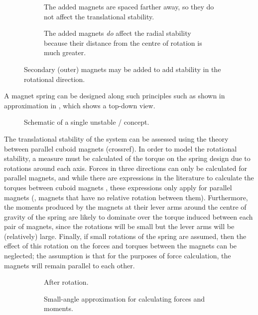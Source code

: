 \begin{figure}
  \begin{subfigure}
    \caption{
     The added magnets are spaced farther away,
     so they do not affect the
     translational stability.
     }
  \end{subfigure}
  \begin{subfigure}
    \caption{
      The added magnets \emph{do} affect the radial stability
      because their distance from the centre of rotation is much greater.
      }
  \end{subfigure}
  \caption{Secondary (outer) magnets may be added to add stability
      in the rotational direction.}
\end{figure}

A magnet spring can be designed along such principles such as shown in
approximation in , which shows a top-down view.

\begin{figure}
  \caption{Schematic of a single unstable \dof/ concept.}
\end{figure}

The translational stability of the system can be assessed using the theory between parallel cuboid magnets (crossref).
In order to model the rotational stability, a measure must be calculated of the torque on the spring design due to rotations around each axis.
Forces in three directions can only be calculated for parallel magnets, and while there are expressions in the literature to calculate the torques between cuboid magnets \cite{janssen2010-ietm}, these expressions only apply for parallel magnets (\ie, magnets that have no relative rotation between them).
Furthermore, the moments produced by the magnets at their lever arms around the centre of gravity of the spring are likely to dominate over the torque induced between each pair of magnets, since the rotations will be small but the lever arms will be (relatively) large.
Finally, if small rotations of the spring are assumed, then the effect of this rotation on the forces and torques between the magnets can be neglected; the assumption is that for the purposes of force calculation, the magnets will remain parallel to each other.

\begin{figure}
  \begin{wide}
    \begin{subfigure}[0.4]
      \caption{After rotation.}
    \end{subfigure}\hfil
    \begin{subfigure}[0.4]
      \caption{Small-angle approximation for calculating forces and moments.}
    \end{subfigure}
  \end{wide}
  \caption{}
\end{figure}

